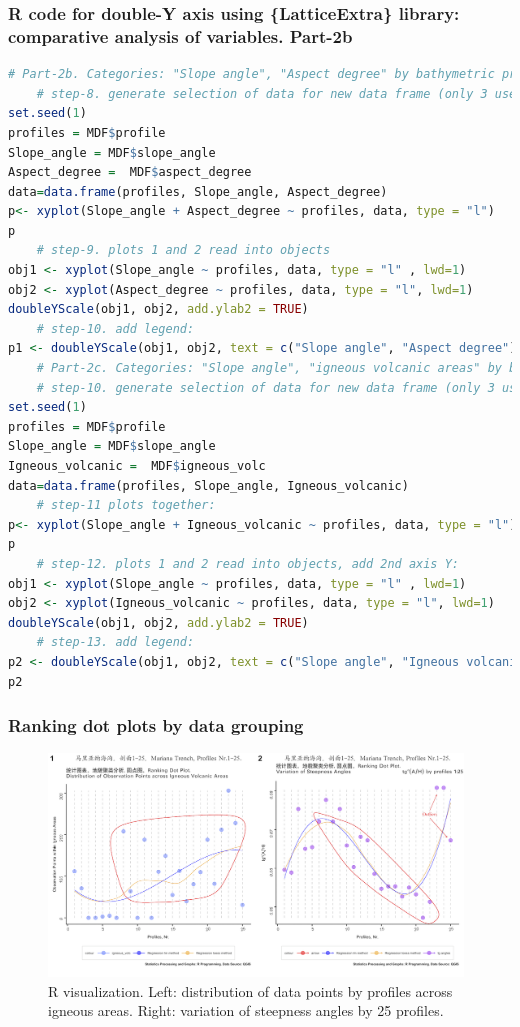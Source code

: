 \documentclass[pdflatex,compress,10pt,
	xcolor={dvipsnames,dvipsnames,svgnames,x11names,table},
	hyperref={colorlinks = true,breaklinks = true, urlcolor = NavyBlue, breaklinks = true}]{beamer}
\begin{document}
\begin{frame}[fragile,shrink=20]\frametitle{R code for double-Y axis using  \{LatticeExtra\} library:\\ comparative analysis of variables. Part-2b}
\begin{lstlisting}[language=R]
	# Part-2b. Categories: "Slope angle", "Aspect degree" by bathymetric profiles
	# step-8. generate selection of data for new data frame (only 3 useful values)
set.seed(1)
profiles = MDF$profile
Slope_angle = MDF$slope_angle
Aspect_degree =  MDF$aspect_degree
data=data.frame(profiles, Slope_angle, Aspect_degree)
p<- xyplot(Slope_angle + Aspect_degree ~ profiles, data, type = "l")
p		
	# step-9. plots 1 and 2 read into objects
obj1 <- xyplot(Slope_angle ~ profiles, data, type = "l" , lwd=1)
obj2 <- xyplot(Aspect_degree ~ profiles, data, type = "l", lwd=1)
doubleYScale(obj1, obj2, add.ylab2 = TRUE)
	# step-10. add legend:
p1 <- doubleYScale(obj1, obj2, text = c("Slope angle", "Aspect degree") , add.ylab2 = TRUE)
	# Part-2c. Categories: "Slope angle", "igneous volcanic areas" by bathymetric profiles
	# step-10. generate selection of data for new data frame (only 3 useful values)
set.seed(1)
profiles = MDF$profile
Slope_angle = MDF$slope_angle
Igneous_volcanic =  MDF$igneous_volc
data=data.frame(profiles, Slope_angle, Igneous_volcanic)
	# step-11 plots together:
p<- xyplot(Slope_angle + Igneous_volcanic ~ profiles, data, type = "l")
p		
	# step-12. plots 1 and 2 read into objects, add 2nd axis Y:
obj1 <- xyplot(Slope_angle ~ profiles, data, type = "l" , lwd=1)
obj2 <- xyplot(Igneous_volcanic ~ profiles, data, type = "l", lwd=1) 
doubleYScale(obj1, obj2, add.ylab2 = TRUE)
	# step-13. add legend:
p2 <- doubleYScale(obj1, obj2, text = c("Slope angle", "Igneous volcanic") , add.ylab2 = TRUE)
p2
\end{lstlisting}
\end{frame}

\begin{frame}\frametitle{Ranking dot plots by data grouping}
\begin{figure}[H]
	\centering
		\includegraphics[width=11cm]{Fig-3-8b.jpg}
	\caption{R visualization. Left: distribution of data points by profiles across igneous areas. Right: variation of steepness angles by 25 profiles.}
\end{figure}		
\end{frame}
\end{document}
